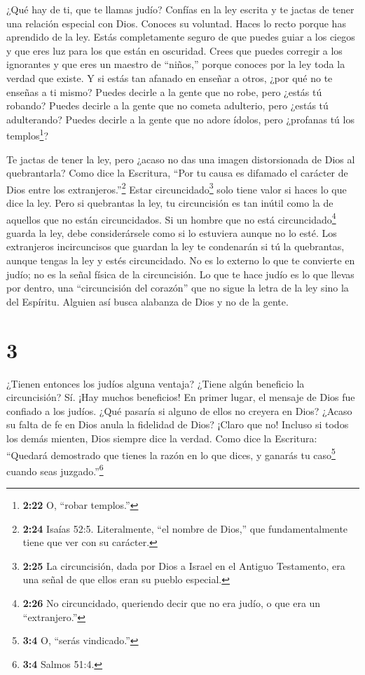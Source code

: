  ¿Qué hay de ti, que te llamas judío? Confías en la ley
escrita y te jactas de tener una relación especial con Dios.
 Conoces su voluntad. Haces lo recto porque has aprendido
de la ley.  Estás completamente seguro de que puedes guiar
a los ciegos y que eres luz para los que están en oscuridad.
 Crees que puedes corregir a los ignorantes y que eres un
maestro de ``niños,'' porque conoces por la ley toda la verdad que
existe.  Y si estás tan afanado en enseñar a otros, ¿por
qué no te enseñas a ti mismo? Puedes decirle a la gente que no robe,
pero ¿estás tú robando?  Puedes decirle a la gente que no
cometa adulterio, pero ¿estás tú adulterando? Puedes decirle a la gente
que no adore ídolos, pero ¿profanas tú los templos\footnote{\textbf{2:22}
  O, ``robar templos.''}?

 Te jactas de tener la ley, pero ¿acaso no das una imagen
distorsionada de Dios al quebrantarla?  Como dice la
Escritura, ``Por tu causa es difamado el carácter de Dios entre los
extranjeros.''\footnote{\textbf{2:24} Isaías 52:5. Literalmente, ``el
  nombre de Dios,'' que fundamentalmente tiene que ver con su carácter.}
 Estar circuncidado\footnote{\textbf{2:25} La circuncisión,
  dada por Dios a Israel en el Antiguo Testamento, era una señal de que
  ellos eran su pueblo especial.} solo tiene valor si haces lo que dice
la ley. Pero si quebrantas la ley, tu circuncisión es tan inútil como la
de aquellos que no están circuncidados.  Si un hombre que
no está circuncidado\footnote{\textbf{2:26} No circuncidado, queriendo
  decir que no era judío, o que era un ``extranjero.''} guarda la ley,
debe considerársele como si lo estuviera aunque no lo esté.
 Los extranjeros incircuncisos que guardan la ley te
condenarán si tú la quebrantas, aunque tengas la ley y estés
circuncidado.  No es lo externo lo que te convierte en
judío; no es la señal física de la circuncisión.  Lo que te
hace judío es lo que llevas por dentro, una ``circuncisión del corazón''
que no sigue la letra de la ley sino la del Espíritu. Alguien así busca
alabanza de Dios y no de la gente.

\hypertarget{section-2}{%
\section{3}\label{section-2}}

 ¿Tienen entonces los judíos alguna ventaja? ¿Tiene algún
beneficio la circuncisión?  Sí. ¡Hay muchos beneficios! En
primer lugar, el mensaje de Dios fue confiado a los judíos. 
¿Qué pasaría si alguno de ellos no creyera en Dios? ¿Acaso su falta de
fe en Dios anula la fidelidad de Dios?  ¡Claro que no!
Incluso si todos los demás mienten, Dios siempre dice la verdad. Como
dice la Escritura: ``Quedará demostrado que tienes la razón en lo que
dices, y ganarás tu caso\footnote{\textbf{3:4} O, ``serás vindicado.''}
cuando seas juzgado.''\footnote{\textbf{3:4} Salmos 51:4.}

